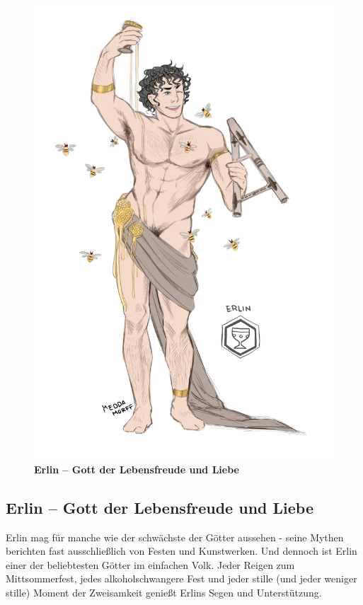 \begin{figure}[tbh]
\begin{minipage}{0.54\textwidth}
		\centering
		\includegraphics[width=0.95\linewidth]{Abbildungen/Gesellschaft/Religion/erlin}
		\captionsetup{width=0.95\linewidth}
		\caption[Erlin -- Gott der Lebensfreude und Liebe]{\textbf{Erlin -- Gott der Lebensfreude und Liebe}}
		\label{fig:erlin}
	\end{minipage}
\end{figure}



\subsection{Erlin -- Gott der Lebensfreude und Liebe}
Erlin mag für manche wie der schwächste der Götter aussehen - seine Mythen berichten fast ausschließlich von Festen und Kunstwerken. 
Und dennoch ist Erlin einer der beliebtesten Götter im einfachen Volk. 
Jeder Reigen zum Mittsommerfest, jedes alkoholschwangere Fest und jeder stille (und jeder weniger stille) Moment der Zweisamkeit genießt Erlins Segen und Unterstützung.

